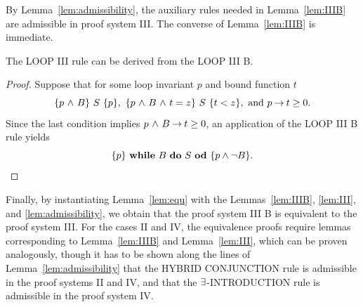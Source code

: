 \documentclass[manuscript, screen, review]{acmart}
\begin{document}
By Lemma~\ref{lem:admissibility}, the auxiliary rules needed in Lemma~\ref{lem:IIIB}
are admissible in proof system III. The converse of Lemma~\ref{lem:IIIB}
is immediate.

\begin{lemma}\label{lem:III}
  The {\rm LOOP III} rule can be derived from the {\rm LOOP III B}. 
\end{lemma}

\begin{proof}
Suppose that for some loop invariant $p$ and bound function $t$
\[
\mbox{$\{{p \mbox{$\ \wedge\ $} B}\}\ {S}\ \{{p}\}$}, \
\mbox{$\{{p \mbox{$\ \wedge\ $} B \mbox{$\ \wedge\ $} t=z}\}\ {S}\ \{{t<z}\}$}, \mbox{  and }  p \mbox{$\:\rightarrow\:$} t \geq 0.
\]
Since the last condition implies $p \mbox{$\ \wedge\ $} B \mbox{$\:\rightarrow\:$} t \geq 0$,
an application of the LOOP III B rule yields
\[
 \mbox{$\{{p}\}\ {\mbox{$\mbox{{\bf while}\ } {B}\ \mbox{{\bf do}\ } {S}\ \mbox{{\bf od}}$}}\ \{{p \wedge \neg B}\}$}.
\]
\end{proof}

Finally, by instantiating Lemma~\ref{lem:equ} with the 
Lemmas~\ref{lem:IIIB}, \ref{lem:III}, and \ref{lem:admissibility}, 
we obtain that the proof system III B is equivalent to the proof system III.
For the cases II and IV, the equivalence proofs require
lemmas corresponding to Lemma~\ref{lem:IIIB} and Lemma~\ref{lem:III},
which can be proven analogously,
though it has to be shown along the lines of Lemma~\ref{lem:admissibility}
that the HYBRID CONJUNCTION rule is admissible in the proof systems II and IV,
and that the $\mbox{$\exists$}$-INTRODUCTION rule is admissible in the proof system IV.


%
\end{document}
